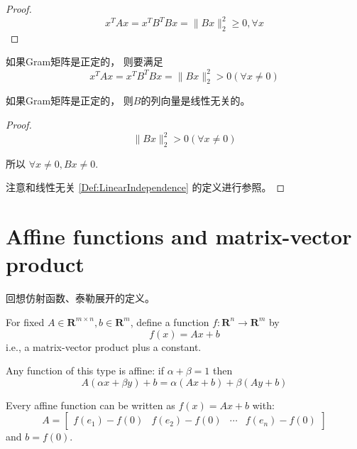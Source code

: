 \begin{proof}
    \begin{equation} x^{T} A x=x^{T} B^{T} B x=\|B x\|_{2}^{2} \geq 0 , \forall x \end{equation}
\end{proof}

\begin{theorem}
    如果Gram矩阵是正定的， 则要满足
    \begin{equation} x^{T} A x=x^{T} B^{T} B x=\|B x\|_{2}^{2}>0 ( \forall x \neq 0) \end{equation}
\end{theorem}

\begin{corollary}
    如果Gram矩阵是正定的， 则$B$的列向量是线性无关的。
\end{corollary}

\begin{proof}
    \begin{equation}\|B x\|_{2}^{2}>0 ( \forall x \neq 0)\end{equation}

所以 $\forall x \neq 0, Bx \neq 0  $.

    注意和线性无关 \ref{Def:LinearIndependence} 的定义进行参照。
\end{proof}

\section{Affine functions and matrix-vector product}


回想仿射函数、泰勒展开的定义。

For fixed $ A \in \mathbf{R}^{m \times n}, b \in \mathbf{R}^{m} $, define a function $ f: \mathbf{R}^{n} \rightarrow \mathbf{R}^{m} $ by
\begin{equation}
f(x)=A x+b
\end{equation}
i.e., a matrix-vector product plus a constant.

Any function of this type is affine: if $ \alpha+\beta=1 $ then
\begin{equation}
A(\alpha x+\beta y)+b=\alpha(A x+b)+\beta(A y+b)
\end{equation}

Every affine function can be written as $ f(x)=A x+b $ with:
\begin{equation}
A=\left[\begin{array}{llll}
f\left(e_{1}\right)-f(0) & f\left(e_{2}\right)-f(0) & \cdots & f\left(e_{n}\right)-f(0)
\end{array}\right]
\end{equation}
and $ b=f(0) $.

